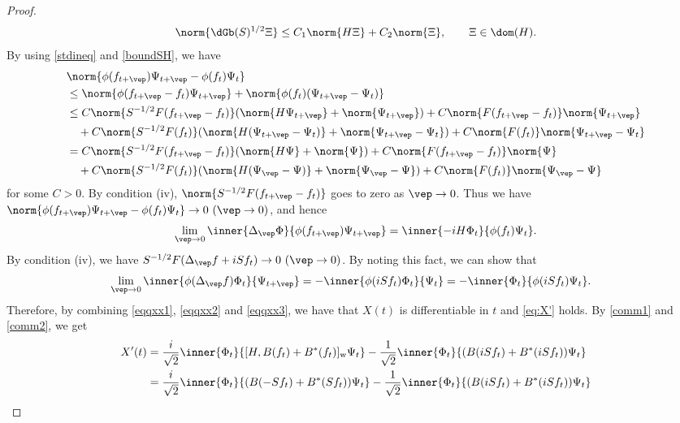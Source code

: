 \documentclass[12pt,draft]{article}
\theoremstyle{plain}
\numberwithin{equation}{section}
\theoremstyle{remark}
\begin{document}
\begin{proof}
\begin{align}
  \norm{\dGb(S)^{1/2}\Xi} \leq C_1\norm{H\Xi}+C_2\norm{\Xi}, \qquad \Xi\in\dom(H).
 \label{boundSH}
\end{align}
By using \eqref{stdineq} and \eqref{boundSH}, we have
\begin{align*}
&\norm{\phi(f_{t+\vep})\Psi_{t+\vep} - \phi(f_t)\Psi_t} \\
&\leq \norm{\phi(f_{t+\vep}-f_t) \Psi_{t+\vep}} + \norm{\phi(f_t) (\Psi_{t+\vep}-\Psi_t)}\\
&\leq C\norm{S^{-1/2}F(f_{t+\vep}-f_t)} (\norm{H\Psi_{t+\vep}} + \norm{\Psi_{t+\vep}})
  + C\norm{F(f_{t+\vep}-f_t)} \norm{\Psi_{t+\vep}} \\
&\quad  + C\norm{S^{-1/2}F(f_t)} (\norm{H(\Psi_{t+\vep}-\Psi_t)} + \norm{\Psi_{t+\vep}-\Psi_t})
  + C\norm{F(f_t)} \norm{\Psi_{t+\vep}-\Psi_t}  \\
&= C\norm{S^{-1/2}F(f_{t+\vep}-f_t)} (\norm{H\Psi} + \norm{\Psi})
  + C\norm{F(f_{t+\vep}-f_t)} \norm{\Psi} \\
&\quad  + C\norm{S^{-1/2}F(f_t)} (\norm{H(\Psi_\vep-\Psi)} + \norm{\Psi_\vep-\Psi})
  + C\norm{F(f_t)} \norm{\Psi_\vep-\Psi}
\end{align*}
for some $C>0$.
By condition (iv), $\norm{S^{-1/2}F(f_{t+\vep}-f_t)}$ goes to zero as $\vep\to 0$.
Thus we have $\norm{\phi(f_{t+\vep})\Psi_{t+\vep} - \phi(f_t)\Psi_t}\to 0\ (\vep \to 0)$, and hence
\begin{align}
  \lim_{\vep\to 0}  \inner{\Delta_\vep\Phi}{\phi(f_{t+\vep})\Psi_{t+\vep}}
 = \inner{-iH\Phi_t}{\phi(f_t)\Psi_t}. \label{eqqxx2}
\end{align}
By condition (iv), we have $S^{-1/2}F(\Delta_\vep f+iSf_t)\to 0\ (\vep\to 0)$.
By noting this fact, we can show that 
\begin{align}
&\lim_{\vep\to 0} \inner{\phi(\Delta_\vep f)\Phi_t}{\Psi_{t+\vep}}
 = -\inner{\phi(iSf_t)\Phi_t}{\Psi_t}
 = -\inner{\Phi_t}{\phi(iSf_t)\Psi_t}. \label{eqqxx3}
\end{align}
Therefore, by combining \eqref{eqqxx1}, \eqref{eqqxx2} and \eqref{eqqxx3}, 
we have that $X(t)$ is differentiable in $t$ and \eqref{eq:X'} holds.
By \eqref{comm1} and \eqref{comm2}, we get 
\begin{align*}
X'(t) 
&= \frac{i}{\sqrt{2}}\inner{\Phi_t}{[H,B(f_t)+B^*(f_t)]_\mathrm{w}\Psi_t}
  -\frac{1}{\sqrt{2}}\inner{\Phi_t}{(B(iSf_t)+B^*(iSf_t))\Psi_t} \\
&= \frac{i}{\sqrt{2}}\inner{\Phi_t}{(B(-Sf_t) + B^*(Sf_t))\Psi_t}
  -\frac{1}{\sqrt{2}}\inner{\Phi_t}{(B(iSf_t)+B^*(iSf_t))\Psi_t} \\

\end{align*}
\end{proof}
\end{document}
